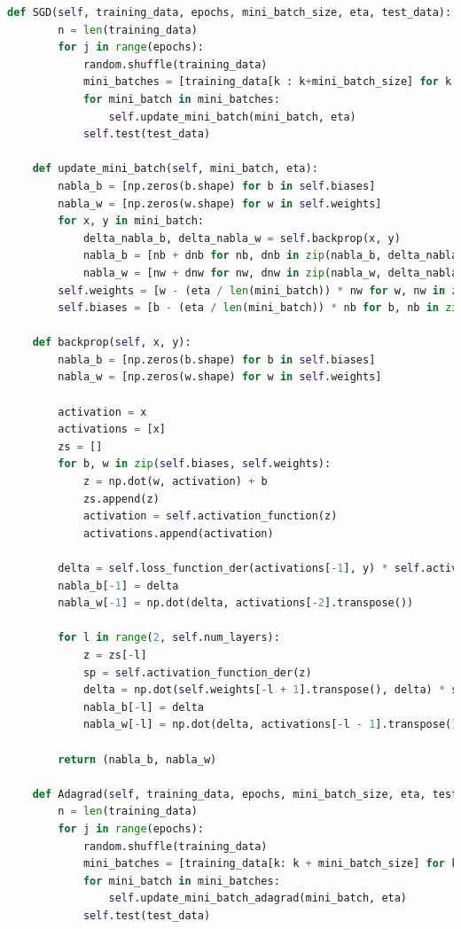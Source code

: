 \documentclass[a4paper, 14pt]{extarticle}
\begin{document}
\begin{lstlisting}[language={python},caption={Методы оптимизации на примере многослойного персептрона, генетический алгоритм},label={lst:code1}]
    def SGD(self, training_data, epochs, mini_batch_size, eta, test_data):
        n = len(training_data)
        for j in range(epochs):
            random.shuffle(training_data)
            mini_batches = [training_data[k : k+mini_batch_size] for k in range(0, n, mini_batch_size)]
            for mini_batch in mini_batches:
                self.update_mini_batch(mini_batch, eta)
            self.test(test_data)

    def update_mini_batch(self, mini_batch, eta):
        nabla_b = [np.zeros(b.shape) for b in self.biases]
        nabla_w = [np.zeros(w.shape) for w in self.weights]
        for x, y in mini_batch:
            delta_nabla_b, delta_nabla_w = self.backprop(x, y)
            nabla_b = [nb + dnb for nb, dnb in zip(nabla_b, delta_nabla_b)]
            nabla_w = [nw + dnw for nw, dnw in zip(nabla_w, delta_nabla_w)]
        self.weights = [w - (eta / len(mini_batch)) * nw for w, nw in zip(self.weights, nabla_w)]
        self.biases = [b - (eta / len(mini_batch)) * nb for b, nb in zip(self.biases, nabla_b)]

    def backprop(self, x, y):
        nabla_b = [np.zeros(b.shape) for b in self.biases]
        nabla_w = [np.zeros(w.shape) for w in self.weights]

        activation = x
        activations = [x]
        zs = []
        for b, w in zip(self.biases, self.weights):
            z = np.dot(w, activation) + b
            zs.append(z)
            activation = self.activation_function(z)
            activations.append(activation)

        delta = self.loss_function_der(activations[-1], y) * self.activation_function_der(zs[-1])
        nabla_b[-1] = delta
        nabla_w[-1] = np.dot(delta, activations[-2].transpose())

        for l in range(2, self.num_layers):
            z = zs[-l]
            sp = self.activation_function_der(z)
            delta = np.dot(self.weights[-l + 1].transpose(), delta) * sp
            nabla_b[-l] = delta
            nabla_w[-l] = np.dot(delta, activations[-l - 1].transpose())

        return (nabla_b, nabla_w)

    def Adagrad(self, training_data, epochs, mini_batch_size, eta, test_data):
        n = len(training_data)
        for j in range(epochs):
            random.shuffle(training_data)
            mini_batches = [training_data[k: k + mini_batch_size] for k in range(0, n, mini_batch_size)]
            for mini_batch in mini_batches:
                self.update_mini_batch_adagrad(mini_batch, eta)
            self.test(test_data)


\end{lstlisting}
\end{document}
